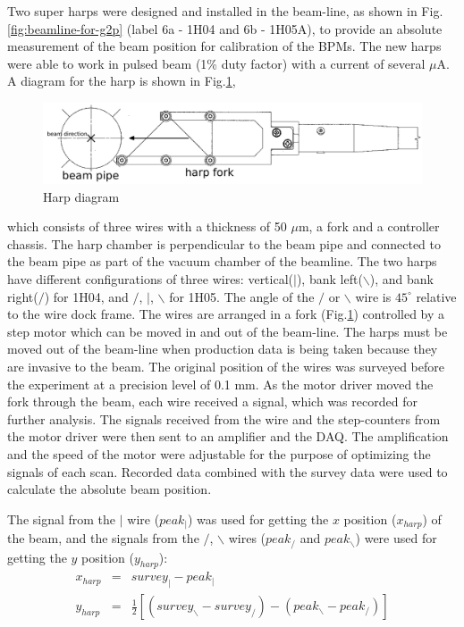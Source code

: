 \documentclass[english,review,number,sort&compress]{elsarticle}
\begin{document}
Two super harps were designed and installed in the beam-line, as shown in Fig.\ref{fig:beamline-for-g2p} (label 6a - 1H04 and 6b - 1H05A), to provide an absolute measurement of the beam position for calibration of the BPMs. The new harps were able to work in pulsed beam (1\% duty factor) with a current of several $\mu$A. A diagram for the harp is shown in Fig.\ref{fig:harp-diagram},
\begin{figure}[tbph]
\begin{centering}
\includegraphics[width=1\columnwidth]{harp_one} 
\par\end{centering}

\protect\caption{\label{fig:harp-diagram}Harp diagram}
\end{figure}
 which consists of three wires with a thickness of 50 $\mu$m, a fork and a controller chassis. The harp chamber is perpendicular to the beam pipe and connected to the beam pipe as part of the vacuum chamber of the beamline. The two harps have different configurations of three wires: vertical($|$), bank left($\backslash$), and bank right($/$) for 1H04, and $/$, $|$, $\backslash$ for 1H05. The angle of the $/$ or $\backslash$ wire is $45^{\circ}$ relative to the wire dock frame. The wires are arranged in a fork (Fig.\ref{fig:harp-diagram}) controlled by a step motor \citep{yan261} which can be moved in and out of the beam-line. The harps must be moved out of the beam-line when production data is being taken because they are invasive to the beam. The original position of the wires was surveyed before the experiment at a precision level of 0.1 mm. As the motor driver moved the fork through the beam, each wire received a signal, which was recorded for further analysis. The signals received from the wire and the step-counters from the motor driver were then sent to an amplifier and the DAQ. The amplification and the speed of the motor were adjustable for the purpose of optimizing the signals of each scan. Recorded data combined with the survey data were used to calculate the absolute beam position.

The signal from the $|$ wire ($peak_{|}$) was used for getting the $x$ position ($x_{harp}$) of the beam, and the signals from the $/$, $\backslash$ wires ($peak_{/}$ and $peak_{\backslash}$) were used for getting the $y$ position ($y_{harp}$): 
\begin{eqnarray}
x_{harp} & = & survey_{|}-peak_{|}\nonumber \\
y_{harp} & = & \frac{1}{2}[(survey_{\backslash}-survey_{/})-(peak_{\backslash}-peak_{/})]\label{eq:harp}
\end{eqnarray}
\end{document}
